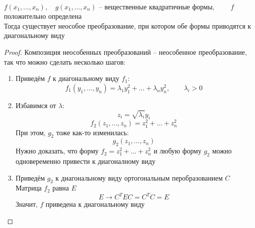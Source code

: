 \begin{theorem}
	\hfill \\
	$ f(x_1, ..., x_n), \quad g(x_1, ..., x_n) $ -- вещественные квадратичные формы, $ \qquad f $ положительно определена \\
	Тогда существует неособое преобразование, при котором обе формы приводятся к диагональному виду
\end{theorem}

\begin{proof}
	Композиция неособенных преобразований -- неособенное преобразование, так что можно сделать несколько шагов:
	\begin{enumerate}
		\item Приведём $ f $ к диагональному виду $ f_1 $:
		$$ f_1(y_1, ..., y_n) = \lambda_1y_1^2 + ... + \lambda_ny_n^2, \qquad \lambda_i > 0 $$
		\item Избавимся от $ \lambda $:
		$$ z_i = \sqrt{\lambda_i}y_i $$
		$$ f_2(z_1, ..., z_n) = z_1^2 + ... + z_n^2 $$
		При этом, $ g_2 $ тоже как-то изменилась:
		$$ g_2(z_1, ..., z_n) $$
		Нужно доказать, что форму $ f_2 = z_1^2 + ... + z_n^2 $ и любую форму $ g_2 $ можно одновеременно привести к диагоналному виду
		\item Приведём $ g_2 $ к диагональному виду ортогональным перобразованием $ C $ \\
		Матрица $ f_2 $ равна $ E $
		$$ E \to C^TEC = C^TC = E $$
		Значит, $ f $ приведена к диагональному виду
	\end{enumerate}
\end{proof}
